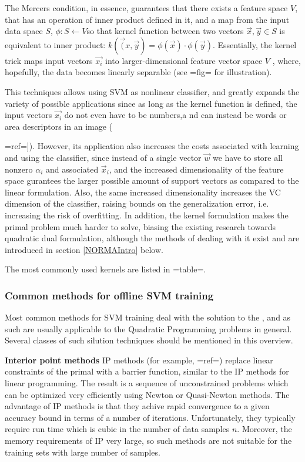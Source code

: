  The Mercers condition, in essence, guarantees that there exists a feature space $V$, that has an operation of inner product defined in it,  and a map from the input data space $S$, $\phi : S \leftarrow V$so that kernel function between two vectors $\vec{x},\vec{y} \in S$ is equivalent to inner product: $k(\vec({x},\vec{y})=\phi(\vec{x})\cdot \phi(\vec{y})$. Essentially, the kernel trick maps input vectors $\vec{x_i}$ into larger-dimensional feature vector space $V$ , where, hopefully, the data becomes linearly separable (see {{=fig=}} for illustration).

This techniques allows using SVM as nonlinear classifier, and greatly expands the  variety of possible applications since as long as the kernel function is defined, the input vectors $\vec{x_i}$ do not even have to be numbers,a nd can instead be words or area descriptors in an image ({{=ref=]}). However, its application also increases the costs associated with learning and using the classifier, since instead of a single vector $\vec{w}$ we have to store all nonzero $\alpha_i$ and associated $\vec{x}_i$, and the increased dimensionality of the feature space gurantees the larger possible amount of support vectors as compared to the linear formulation. Also, the same increased dimensionality increases the VC dimension of the classifier, raising bounds on the generalization error, i.e. increasing the risk of overfitting. In addition, the kernel formulation makes the primal problem much harder to solve, biasing the existing research towards quadratic dual formulation, although the methods of dealing with it exist and are introduced in  section \ref{NORMAIntro} below.

The most commonly used kernels are listed in {{=table=}}.



\subsubsection{Common methods for offline SVM training}
Most common methods for SVM training deal with the solution to the , and as such are usually applicable to the Quadratic Programming problems in general. Several classes of such silution techniques should be mentioned in this overview. 

{\bf Interior point methods}
IP methods (for example, {{=ref=}}) replace linear constraints of the primal with a barrier function, similar to the IP methods for linear programming.  The result is a sequence of unconstrained problems which can be optimized very efficiently using Newton or Quasi-Newton methods. The advantage of IP methods is that they achive rapid convergence to a given accuracy bound in terms of a number of iterations. Unfortunately, they typically require run time which is cubic in the number of data samples $n$. Moreover, the memory requirements of IP  very large, so such methods are not suitable for the training sets with large number of samples.

}
